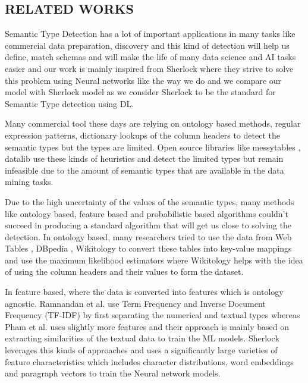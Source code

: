 \documentclass[12pt, a4paper]{report}
\theoremstyle{definition}
\numberwithin{equation}{chapter}
\numberwithin{figure}{chapter}
\numberwithin{table}{chapter}
\begin{document}
\begin{spacing}{1.5}
\chapter{RELATED WORKS}
\label{chap:rw}
\setlength{\parindent}{0em}
Semantic Type Detection has a lot of important applications in many tasks like commercial data preparation, discovery and this kind of detection will help us define, match schemas and will make the life of many data science and AI tasks easier and our work is mainly inspired from Sherlock  \cite{sherlock} where they strive to solve this problem using Neural networks like the way we do and we compare our model with Sherlock model as we consider Sherlock to be the standard for Semantic Type detection using DL. 
\par
\setlength{\parskip}{2.2em}
\setlength{\parindent}{0em}
Many commercial tool these days are relying on ontology based methods, regular expression patterns, dictionary lookups of the column headers to detect the semantic types but the types are limited.  Open source libraries like messytables \cite{messytables}, datalib \cite{datalib} use these kinds of heuristics and detect the limited types but remain infeasible due to the amount of semantic types that are available in the data mining tasks. 
\par
\setlength{\parskip}{2.2em}
\setlength{\parindent}{0em}
Due to the high uncertainty of the values of the semantic types, many methods like ontology based, feature based and probabilistic based algorithms couldn't succeed in producing a standard algorithm that will get us close to solving the detection. In ontology based, many researchers tried to use the data from Web Tables \cite{webtable}, DBpedia \cite{dbpedia, wttodbpedia}, Wikitology \cite{30} to convert these tables into key-value mappings and use the maximum likelihood estimators where Wikitology \cite{30} helps with the idea of using the column headers and their values to form the dataset.
\par
\setlength{\parskip}{2.2em}
\setlength{\parindent}{0em}
In feature based, where the data is converted into features which is ontology agnostic. Ramnandan et al. \cite{27} use Term Frequency and Inverse Document Frequency (TF-IDF)  by first separating the numerical and textual types whereas Pham et al. \cite{23} uses slightly more features and their approach is mainly based on extracting similarities of the textual data to train the ML models. Sherlock leverages this kinds of approaches and uses a significantly large varieties of feature characteristics which includes character distributions, word embeddings and paragraph vectors to train the Neural network models.

\end{spacing}
\end{document}

